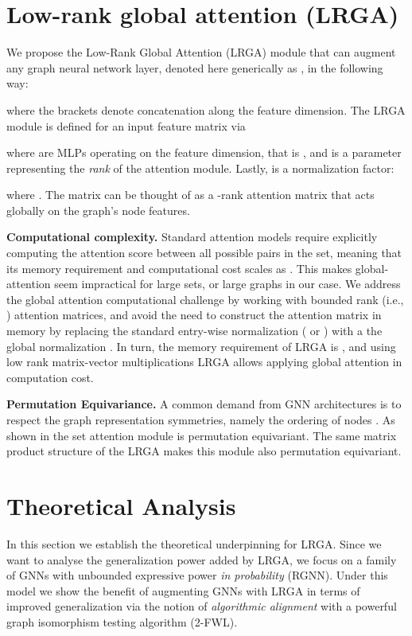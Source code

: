 \documentclass{article} \usepackage{iclr2021_conference,times}
\newcommand{\ie}{{i.e.}}
\begin{document}
\section{Low-rank global attention (LRGA)}

\label{sec:model}
We propose the Low-Rank Global Attention (LRGA) module that can augment any graph neural network layer, denoted here generically as , in the following way:

where the brackets denote concatenation along the feature dimension. The LRGA module is defined for an input feature matrix  via 

where  are MLPs operating on the feature dimension, that is , and  is a parameter representing the \emph{rank} of the attention module. Lastly,  is a normalization factor:

where . 
The matrix  can be thought of as a -rank attention matrix that acts globally on the graph's node features.



\textbf{Computational complexity.}\label{s:prelim}
Standard attention models \citep{vaswani2017attention,Luong2015} require explicitly computing the attention score between all possible pairs in the set, meaning that its memory requirement and computational cost scales as . This makes global-attention seem impractical for large sets, or large graphs in our case. We address the global attention computational challenge by working with bounded rank (\ie, ) attention matrices, and avoid the need to construct the attention matrix in memory by replacing the standard entry-wise normalization ( or ) with a the global normalization . In turn, the memory requirement of LRGA is , and using low rank matrix-vector multiplications LRGA allows applying global attention in  computation cost.  

\textbf{Permutation Equivariance.} A common demand from GNN architectures is to respect the graph representation symmetries, namely the ordering of nodes \citep{Maron2019}. As shown in \citep{lee2018set} the set attention module is permutation equivariant. The same matrix product structure of the LRGA makes this module also permutation equivariant. 






\section{Theoretical Analysis} \label{sec: theo_analysis}
In this section we establish the theoretical underpinning for LRGA. Since we want to analyse the generalization power added by LRGA, we focus on a family of GNNs with unbounded expressive power \emph{in probability} (RGNN). Under this model we show the benefit of augmenting GNNs with LRGA in terms of improved generalization via the notion of \textit{algorithmic alignment} with a powerful graph isomorphism testing algorithm (2-FWL). 
\end{document}
